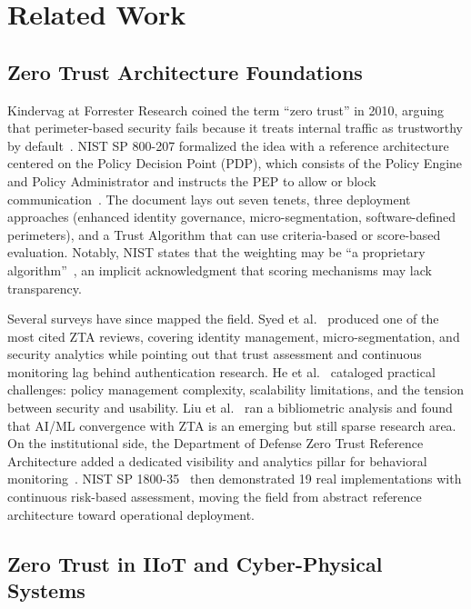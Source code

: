 \documentclass[conference]{IEEEtran}
\begin{document}
\section{Related Work}

\subsection{Zero Trust Architecture Foundations}

Kindervag at Forrester Research coined the term ``zero trust'' in 2010, arguing that perimeter-based security fails because it treats internal traffic as trustworthy by default~\cite{kindervag2010}. NIST SP 800-207 formalized the idea with a reference architecture centered on the Policy Decision Point (PDP), which consists of the Policy Engine and Policy Administrator and instructs the PEP to allow or block communication~\cite{nist800207}. The document lays out seven tenets, three deployment approaches (enhanced identity governance, micro-segmentation, software-defined perimeters), and a Trust Algorithm that can use criteria-based or score-based evaluation. Notably, NIST states that the weighting may be ``a proprietary algorithm''~\cite{nist800207}, an implicit acknowledgment that scoring mechanisms may lack transparency.

Several surveys have since mapped the field. Syed et al.~\cite{syed2022} produced one of the most cited ZTA reviews, covering identity management, micro-segmentation, and security analytics while pointing out that trust assessment and continuous monitoring lag behind authentication research. He et al.~\cite{he2022} cataloged practical challenges: policy management complexity, scalability limitations, and the tension between security and usability. Liu et al.~\cite{liuzt2024} ran a bibliometric analysis and found that AI/ML convergence with ZTA is an emerging but still sparse research area. On the institutional side, the Department of Defense Zero Trust Reference Architecture added a dedicated visibility and analytics pillar for behavioral monitoring~\cite{dodzta2022}. NIST SP 1800-35~\cite{nist180035} then demonstrated 19 real implementations with continuous risk-based assessment, moving the field from abstract reference architecture toward operational deployment.

\subsection{Zero Trust in IIoT and Cyber-Physical Systems}
\end{document}
